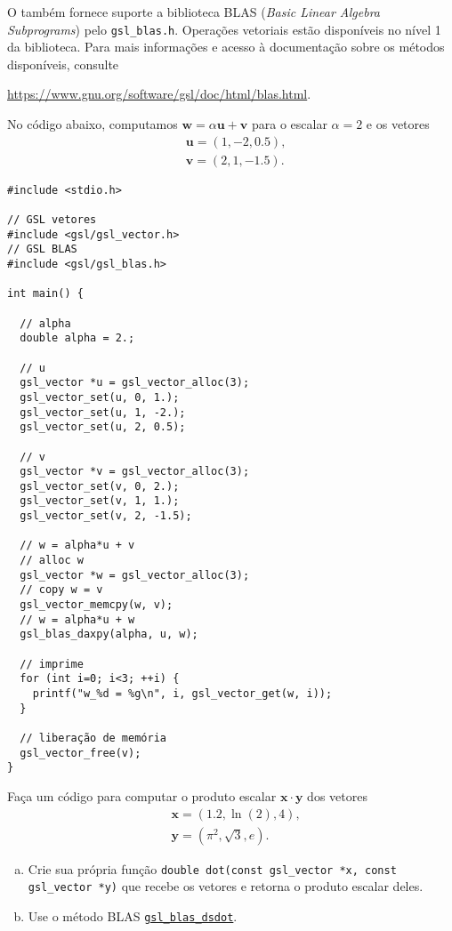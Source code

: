 \documentclass[12pt]{article}
\begin{document}
\begin{obs}
  O {\gsl} também fornece suporte a biblioteca BLAS (\textit{Basic Linear Algebra Subprograms}) pelo \lstinline!gsl_blas.h!. Operações vetoriais estão disponíveis no nível 1 da biblioteca. Para mais informações e acesso à documentação sobre os métodos disponíveis, consulte
  \begin{center}
    \url{https://www.gnu.org/software/gsl/doc/html/blas.html}.
  \end{center}
\end{obs}

\begin{ex}
  No código abaixo, computamos $\pmb{w} = \alpha \pmb{u} + \pmb{v}$ para o escalar $\alpha = 2$ e os vetores
  \begin{equation}
    \begin{aligned}
      &\pmb{u} = (1, -2, 0.5),\\
      &\pmb{v} = (2, 1, -1.5).
    \end{aligned}
  \end{equation}

\begin{lstlisting}[caption=axpy.cc]
#include <stdio.h>

// GSL vetores
#include <gsl/gsl_vector.h>
// GSL BLAS
#include <gsl/gsl_blas.h>

int main() {

  // alpha
  double alpha = 2.;
  
  // u
  gsl_vector *u = gsl_vector_alloc(3);
  gsl_vector_set(u, 0, 1.);
  gsl_vector_set(u, 1, -2.);
  gsl_vector_set(u, 2, 0.5);

  // v
  gsl_vector *v = gsl_vector_alloc(3);
  gsl_vector_set(v, 0, 2.);
  gsl_vector_set(v, 1, 1.);
  gsl_vector_set(v, 2, -1.5);

  // w = alpha*u + v
  // alloc w
  gsl_vector *w = gsl_vector_alloc(3);
  // copy w = v
  gsl_vector_memcpy(w, v);
  // w = alpha*u + w
  gsl_blas_daxpy(alpha, u, w);
  
  // imprime
  for (int i=0; i<3; ++i) {
    printf("w_%d = %g\n", i, gsl_vector_get(w, i));
  }
  
  // liberação de memória
  gsl_vector_free(v);
}
\end{lstlisting}
\end{ex}

\begin{exr}
  Faça um código para computar o produto escalar $\pmb{x}\cdot\pmb{y}$ dos vetores
  \begin{align}
    &\pmb{x} = (1.2, \ln(2), 4),\\
    &\pmb{y} = (\pi^2, \sqrt{3}, e).
  \end{align}
  \begin{enumerate}[a)]
  \item Crie sua própria função \lstinline+double dot(const gsl_vector *x, const gsl_vector *y)+ que recebe os vetores e retorna o produto escalar deles.
  \item Use o método BLAS \href{https://www.gnu.org/software/gsl/doc/html/blas.html\#c.gsl_blas_dsdot}{\lstinline+gsl_blas_dsdot+}.
  \end{enumerate}
\end{exr}
\end{document}
